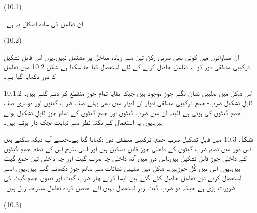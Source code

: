  
(10.1)

	ان تفاعل کی سادہ اشکال یہ ہے۔

 
(10.2)

ان مساواتوں میں کوئی بھی ضربی رکن تین سے زیادہ مداخل پر مشتمل نہیں۔یوں اس قابلِ تشکیل ترکیبی منطقی دور کو یہ تفاعل حاصل کرنے کے لئے استعمال کیا جا سکتا ہے۔شکل 10.2 میں تفاعل کا دور دکھایا گیا ہے۔


اس شکل میں صلیبی نشان لگے جوڑ موجود ہیں جبکہ بقایا تمام جوڑ منقطع کر دئے گئے ہیں۔
10.1.2 قابلِ تشکیل ضرب- جمع ترکیبی منطقی ادوار
	ان ادوار میں بھی پہلے صف ضرب گیٹوں اور دوسری صف جمع گیٹوں کی ہوتی ہے البتہ ان میں ضرب گیٹوں اور جمع گیٹوں کے تمام جوڑ قابلِ تشکیل ہوتے ہیں۔یوں یہ استعمال کے نکتہ نظر سے نہایت لچک دار ہوتے ہیں۔ 


	شکل 10.3 میں قابلِ تشکیل ضرب-جمع، ترکیبی منطقی دور دکھایا گیا ہے۔جیسے آپ دیکھ سکتے ہیں اس دور میں تمام ضرب گیٹوں کے داخلی جوڑ قابلِ تشکیل ہیں اور اسی طرح اس کے تمام جمع گیٹوں کے داخلی جوڑ قابلِ تشکیل ہیں۔اس دور میں آٹھ داخلی چہ ضرب گیٹ اور چہ داخلی تین جمع گیٹ ہیں۔یوں اس میں کُل جوڑہیں۔
	شکل میں صلیبی نشانات سے سالم جوڑ دکھائے گئے ہیں۔یوں اسے استعمال کرتے تین تفاعل حاصل کئے گئے ہیں۔ایسا کرتے چار ضرب گیٹ اور تینوں جمع گیٹ کی ضرورت پڑی ہے جبکہ دو ضرب گیٹ زیرِ استعمال نہیں آئے۔حاصل کردہ تفاعل مندرجہ زیل ہیں۔

 
(10.3)
 
